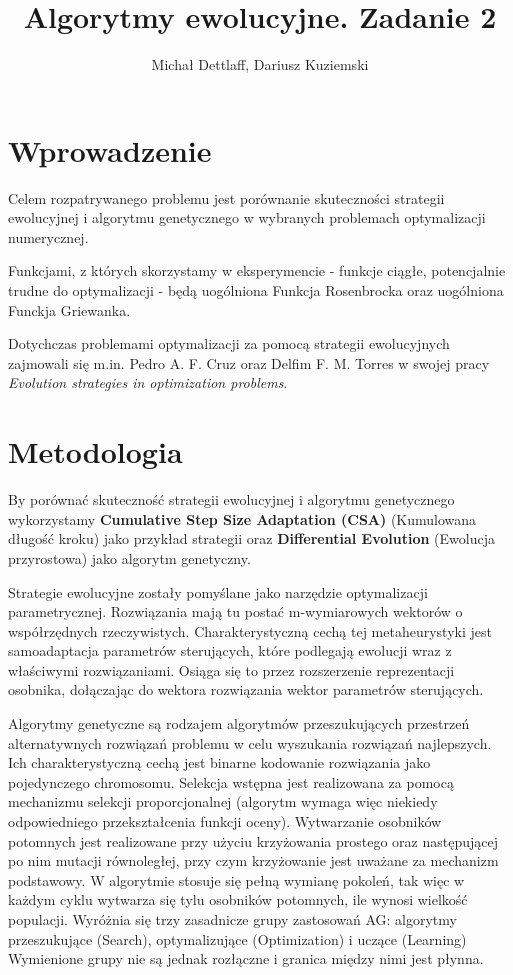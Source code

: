 \documentclass[11pt]{article}
\begin{document}
\title{Algorytmy ewolucyjne. Zadanie 2}
\author{Michał Dettlaff, Dariusz Kuziemski}
\maketitle

\section{Wprowadzenie}

\noindent
Celem rozpatrywanego problemu jest porównanie skuteczności 
strategii ewolucyjnej i algorytmu genetycznego w wybranych 
problemach optymalizacji numerycznej.

Funkcjami, z których skorzystamy w eksperymencie - funkcje
ciągłe, potencjalnie trudne do optymalizacji - będą uogólniona 
Funkcja Rosenbrocka oraz uogólniona Funckja Griewanka.

Dotychczas problemami optymalizacji za pomocą strategii
ewolucyjnych zajmowali się m.in. Pedro A. F. Cruz oraz
 Delfim F. M. Torres w swojej pracy 
\textit{Evolution strategies in optimization problems}. 


\section{Metodologia}
\noindent
By porównać skuteczność strategii ewolucyjnej i algorytmu 
genetycznego wykorzystamy \textbf{ Cumulative Step Size Adaptation (CSA)}
(Kumulowana długość kroku) jako przykład strategii oraz 
\textbf{Differential Evolution} (Ewolucja przyrostowa) jako algorytm genetyczny.

Strategie ewolucyjne zostały pomyślane jako narzędzie optymalizacji
parametrycznej. Rozwiązania mają tu postać m-wymiarowych wektorów
o współrzędnych rzeczywistych. Charakterystyczną cechą tej
metaheurystyki jest samoadaptacja parametrów sterujących,
które podlegają ewolucji wraz z właściwymi rozwiązaniami. 
Osiąga się to przez rozszerzenie reprezentacji osobnika,
dołączając do wektora rozwiązania wektor parametrów sterujących.

Algorytmy genetyczne są rodzajem algorytmów przeszukujących
przestrzeń alternatywnych rozwiązań problemu w celu wyszukania 
rozwiązań najlepszych. Ich charakterystyczną cechą jest 
binarne kodowanie rozwiązania jako pojedynczego chromosomu. 
Selekcja wstępna jest realizowana za pomocą mechanizmu selekcji 
proporcjonalnej (algorytm wymaga więc niekiedy odpowiedniego 
przekształcenia funkcji oceny). Wytwarzanie osobników potomnych
jest realizowane przy użyciu krzyżowania prostego oraz 
następującej po nim mutacji równoległej, przy czym krzyżowanie 
jest uważane za mechanizm podstawowy. W algorytmie stosuje się 
pełną wymianę pokoleń, tak więc w każdym cyklu wytwarza się tylu 
osobników potomnych, ile wynosi wielkość populacji. Wyróżnia się 
trzy zasadnicze grupy zastosowań AG: algorytmy przeszukujące 
(Search), optymalizujące (Optimization) i uczące (Learning) 
Wymienione grupy nie są jednak rozłączne i granica między 
nimi jest płynna.
\end{document}
